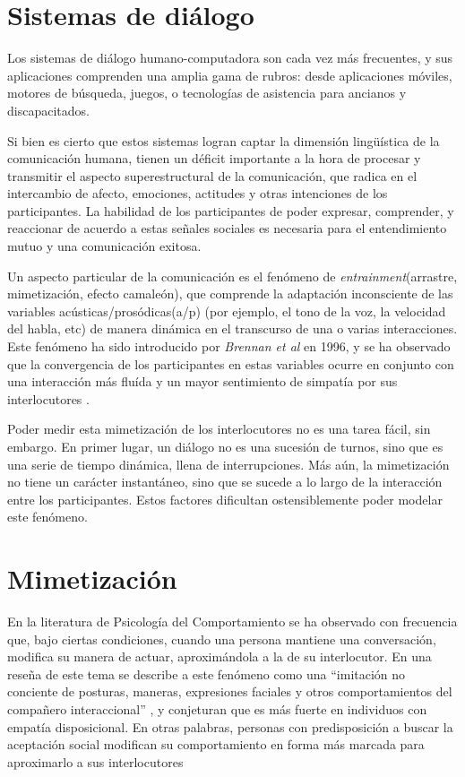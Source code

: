 
\section{Sistemas de diálogo}

Los sistemas de diálogo humano-computadora son cada vez más frecuentes, y sus aplicaciones comprenden una amplia gama de rubros: desde aplicaciones móviles, motores de búsqueda, juegos, o tecnologías de asistencia para ancianos y discapacitados.

Si bien es cierto que estos sistemas logran captar la dimensión lingüística de la comunicación humana, tienen un déficit importante a la hora de procesar y transmitir el aspecto superestructural de la comunicación, que radica en el intercambio de afecto, emociones, actitudes y otras intenciones de los participantes. La habilidad de los participantes de poder expresar, comprender, y reaccionar de acuerdo a estas señales sociales es necesaria para el entendimiento mutuo y una comunicación exitosa.

Un aspecto particular de la comunicación es el fenómeno de \emph{entrainment}(arrastre, mimetización, efecto camaleón), que comprende la adaptación inconsciente de las variables acústicas/prosódicas(a/p) (por ejemplo, el tono de la voz, la velocidad del habla, etc) de manera dinámica en el transcurso de una o varias interacciones. Este fenómeno ha sido introducido por \emph{Brennan et al}\cite{BRE1996} en 1996, y se ha observado que la convergencia de los participantes en estas variables ocurre en conjunto con una interacción más fluída y un mayor sentimiento de simpatía por sus interlocutores \cite{CHAR1999}.

Poder medir esta mimetización de los interlocutores no es una tarea fácil, sin embargo. En primer lugar, un diálogo no es una sucesión de turnos, sino que es una serie de tiempo dinámica, llena de interrupciones. Más aún, la mimetización no tiene un carácter instantáneo, sino que se sucede a lo largo de la interacción entre los participantes. Estos factores dificultan ostensiblemente poder modelar este fenómeno.

\section{Mimetización}

En la literatura de Psicología del Comportamiento se ha observado con frecuencia que, bajo ciertas condiciones, cuando una persona mantiene una conversación, modifica su manera de actuar, aproximándola a la de su interlocutor. En una reseña de este tema se describe a este fenómeno como una ``imitación no conciente de posturas, maneras, expresiones faciales y otros comportamientos del compañero interaccional'' \cite[p. 893]{CHAR1999} , y conjeturan que es más fuerte en individuos con empatía disposicional. En otras palabras, personas con predisposición a buscar la
aceptación social modifican su comportamiento en forma más marcada para aproximarlo a sus interlocutores

